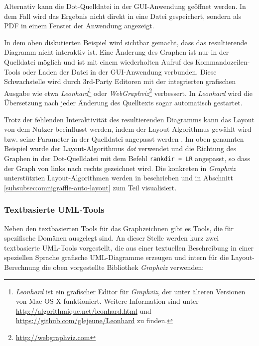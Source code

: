 Alternativ kann die Dot-Quelldatei in der GUI-Anwendung geöffnet werden. In dem Fall wird das Ergebnis nicht direkt in eine Datei gespeichert, sondern als PDF in einem Fenster der Anwendung angezeigt.

In dem oben diskutierten Beispiel wird sichtbar gemacht, dass das resultierende Diagramm nicht interaktiv ist. Eine Änderung des Graphen ist nur in der Quelldatei möglich und ist mit einem wiederholten Aufruf des Kommandozeilen-Tools oder Laden der Datei in der GUI-An\-wen\-dung verbunden. Diese Schwachstelle wird durch 3rd-Party Editoren mit der integrierten grafischen Ausgabe wie etwa \textit{Leonhard}\footnote{\textit{Leonhard} ist ein grafischer Editor für \textit{Graphviz}, der unter älteren Versionen von Mac OS X funktioniert. Weitere Information sind unter \url{http://algorithmique.net/leonhard.html} und \url{https://github.com/glejeune/Leonhard} zu finden.} oder \textit{WebGraphviz}\footnote{\url{http://webgraphviz.com}} verbessert. In \textit{Leonhard} wird die Übersetzung nach jeder Änderung des Quelltexts sogar automatisch gestartet.

Trotz der fehlenden Interaktivität des resultierenden Diagramms kann das Layout von dem Nutzer beeinflusst werden, indem der Layout-Algorithmus gewählt wird bzw. seine Parameter in der Quelldatei angepasst werden \cite{NorthGansner14Dot-Manual}. Im oben genannten Beispiel wurde der Layout-Algorithmus \textit{dot} verwendet und die Richtung des Graphen in der Dot-Quelldatei mit dem Befehl \texttt{rankdir = LR} angepasst, so dass der Graph von links nach rechts gezeichnet wird. Die konkreten in \textit{Graphviz} unterstützten Layout-Algorithmen werden in \cite[S.22]{Gansner14Using} beschrieben und in Abschnitt \ref{subsubsec:omnigraffle-auto-layout} zum Teil visualisiert.

\subsubsection{Textbasierte UML-Tools}

Neben den textbasierten Tools für das Graphzeichnen gibt es Tools, die für spezifische Domänen ausgelegt sind. An dieser Stelle werden kurz zwei textbasierte UML-Tools vorgestellt, die aus einer textuellen Beschreibung in einer speziellen Sprache grafische UML-Diagramme erzeugen und intern für die Layout-Berechnung die oben vorgestellte Bibliothek \textit{Graphviz} verwenden:

